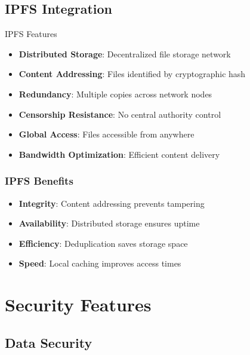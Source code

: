 \documentclass[11pt,a4paper]{article}
\begin{document}
\subsection{IPFS Integration}

\begin{techbox}{\faServer\space IPFS Features}
\begin{itemize}
    \item \textbf{Distributed Storage}: Decentralized file storage network
    \item \textbf{Content Addressing}: Files identified by cryptographic hash
    \item \textbf{Redundancy}: Multiple copies across network nodes
    \item \textbf{Censorship Resistance}: No central authority control
    \item \textbf{Global Access}: Files accessible from anywhere
    \item \textbf{Bandwidth Optimization}: Efficient content delivery
\end{itemize}
\end{techbox}

\subsubsection{IPFS Benefits}
\begin{itemize}
    \item \textbf{Integrity}: Content addressing prevents tampering
    \item \textbf{Availability}: Distributed storage ensures uptime
    \item \textbf{Efficiency}: Deduplication saves storage space
    \item \textbf{Speed}: Local caching improves access times
\end{itemize}

\section{Security Features}

\subsection{Data Security}
\end{document}
